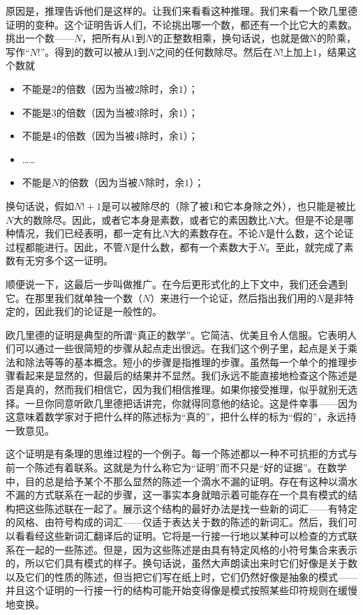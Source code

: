 原因是，推理告诉他们是这样的。让我们来看看这种推理。我们来看一个欧几里德证明的变种。这个证明告诉人们，不论挑出哪一个数，都还有一个比它大的素数。挑出一个数——$N$，把所有从$1$到$N$的正整数相乘，换句话说，也就是做N的阶乘，写作“$N!$”。得到的数可以被从$1$到$N$之间的任何数除尽。然后在$N!$上加上$1$，结果这个数就
\begin{itemize}
\item 不能是$2$的倍数（因为当被$2$除时，余$1$）；
\item 不能是$3$的倍数（因为当被$3$除时，余$1$）；
\item 不能是$4$的倍数（因为当被$4$除时，余$1$）；
\item ……
\item 不能是$N$的倍数（因为当被$N$除时，余$1$）；
\end{itemize}
换句话说，假如$N!+1$是可以被除尽的（除了被$1$和它本身除之外），也只能是被比$N$大的数除尽。因此，或者它本身是素数，或者它的素因数比$N$大。但是不论是哪种情况，我们已经表明，都一定有比$N$大的素数存在。不论$N$是什么数，这个论证过程都能进行。因此，不管$N$是什么数，都有一个素数大于$N$。至此，就完成了素数有无穷多个这一证明。

顺便说一下，这最后一步叫做推广。在今后更形式化的上下文中，我们还会遇到它。在那里我们就单独一个数（$N$）来进行一个论证，然后指出我们用的$N$是非特定的，因此我们的论证是一般性的。

欧几里德的证明是典型的所谓“真正的数学”。它简洁、优美且令人信服。它表明人们可以通过一些很简短的步骤从起点走出很远。在我们这个例子里，起点是关于乘法和除法等等的基本概念。短小的步骤是指推理的步骤。虽然每一个单个的推理步骤看起来是显然的，但最后的结果并不显然。我们永远不能直接地检查这个陈述是否是真的，然而我们相信它，因为我们相信推理。如果你接受推理，似乎就别无选择。一旦你同意听欧几里德把话讲完，你就得同意他的结论。这是件幸事——因为这意味着数学家对于把什么样的陈述标为“真的”，把什么样的标为“假的”，永远持一致意见。

这个证明是有条理的思维过程的一个例子。每一个陈述都以一种不可抗拒的方式与前一个陈述有着联系。这就是为什么称它为“证明”而不只是“好的证据”。在数学中，目的总是给予某个不那么显然的陈述一个滴水不漏的证明。存在有这种以滴水不漏的方式联系在一起的步骤，这一事实本身就暗示着可能存在一个具有模式的结构把这些陈述联在一起了。展示这个结构的最好办法是找一些新的词汇——有特定的风格、由符号构成的词汇——仅适于表达关于数的陈述的新词汇。然后，我们可以看看经这些新词汇翻译后的证明。它将是一行接一行地以某种可以检查的方式联系在一起的一些陈述。但是，因为这些陈述是由具有特定风格的小符号集合来表示的，所以它们具有模式的样子。换句话说，虽然大声朗读出来时它们好像是关于数以及它们的性质的陈述，但当把它们写在纸上时，它们仍然好像是抽象的模式——并且这个证明的一行接一行的结构可能开始变得像是模式按照某些印符规则在缓慢地变换。


